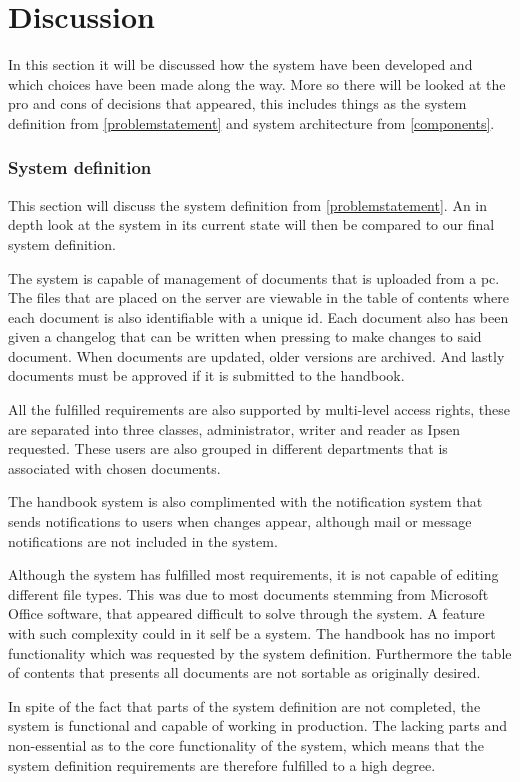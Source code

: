 \chapter{Discussion}
In this section it will be discussed how the system have been developed and which choices have been made along the way. More so there will be looked at the pro and cons of decisions that appeared, this includes things as the system definition from \cref{problemstatement} and system architecture from \cref{components}.

\subsection{System definition}
This section will discuss the system definition from \cref{problemstatement}. An in depth look at the system in its current state will then be compared to our final system definition.

The system is capable of management of documents that is uploaded from a pc. The files that are placed on the server are viewable in the table of contents where each document is also identifiable with a unique id. Each document also has been given a changelog that can be written when pressing to make changes to said document. When documents are updated, older versions are archived. And lastly documents must be approved if it is submitted to the handbook.

All the fulfilled requirements are also supported by multi-level access rights, these are separated into three classes, administrator, writer and reader as Ipsen requested. These users are also grouped in different departments that is associated with chosen documents.

The handbook system is also complimented with the notification system that sends notifications to users when changes appear, although mail or message notifications are not included in the system.

Although the system has fulfilled most requirements, it is not capable of editing different file types. This was due to most documents stemming from Microsoft Office software, that appeared difficult to solve through the system. A feature with such complexity could in it self be a system. The handbook has no import functionality which was requested by the system definition. Furthermore the table of contents that presents all documents are not sortable as originally desired.

In spite of the fact that parts of the system definition are not completed, the system is functional and capable of working in production. The lacking parts and non-essential as to the core functionality of the system, which means that the system definition requirements are therefore fulfilled to a high degree.

